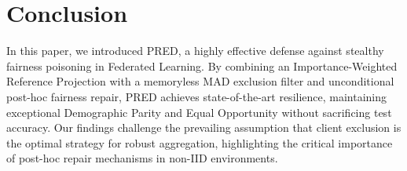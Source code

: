 \documentclass[journal]{IEEEtran}
\begin{document}
\section{Conclusion}
In this paper, we introduced PRED, a highly effective defense against stealthy fairness poisoning in Federated Learning. By combining an Importance-Weighted Reference Projection with a memoryless MAD exclusion filter and unconditional post-hoc fairness repair, PRED achieves state-of-the-art resilience, maintaining exceptional Demographic Parity and Equal Opportunity without sacrificing test accuracy. Our findings challenge the prevailing assumption that client exclusion is the optimal strategy for robust aggregation, highlighting the critical importance of post-hoc repair mechanisms in non-IID environments.



\end{document}
